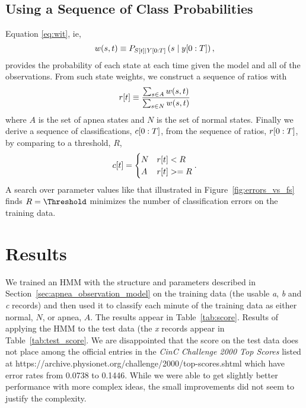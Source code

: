 \subsection{Using a Sequence of Class Probabilities}
\label{sec:prettygood}

Equation \eqref{eq:wit}, ie,
\begin{equation*}
  w(s,t) \equiv P_{{S}{[t]}\mid Y[0:T]} \left(s\mid y[0:T]
  \right),
\end{equation*}
provides the probability of each state at each time given the model and
all of the observations.  From such state weights, we construct a
sequence of ratios with
\begin{equation*}
  {r}{[t]} \equiv \frac{\sum_{s\in A} w(s,t)}{\sum_{s\in N} w(s,t)}
\end{equation*}
where $A$ is the set of apnea states and $N$ is the set of normal
states.  Finally we derive a sequence of classifications,
$c[0:T]$, from the sequence of ratios, $r[0:T]$, by
comparing to a threshold, $R$,
\begin{equation}
  \label{eq:class_sequence}
  {c}{[t]} =
  \begin{cases}
    N & {r}{[t]} < R \\
    A & {r}{[t]} >= R
  \end{cases}.
\end{equation}
A search over parameter values like that illustrated in
Figure~\ref{fig:errors_vs_fs} finds $R=\Threshold$ minimizes the number of
classification errors on the training data.

\section{Results}
\label{sec:results}

We trained an HMM with the structure and parameters described in
Section~\ref{sec:apnea_observation_model} on the training data (the
usable \emph{a}, \emph{b} and \emph{c} records) and then used it to
classify each minute of the training data as either normal, $N$, or
apnea, $A$.  The results appear in Table~\ref{tab:score}.  Results of
applying the HMM to the test data (the \emph{x} records appear in
Table~\ref{tab:test_score}.  We are disappointed that the score on the
test data does not place among the official entries in the \emph{CinC
  Challenge 2000 Top Scores} listed at
https://archive.physionet.org/challenge/2000/top-scores.shtml which
have error rates from 0.0738 to 0.1446.  While we were able to get
slightly better performance with more complex ideas, the small
improvements did not seem to justify the complexity.

